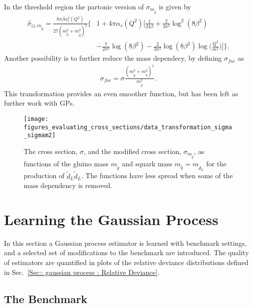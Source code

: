 \documentclass[twoside,english]{uiofysmaster}
\begin{document}
In the threshold region the partonic version of $\sigma_{m_{\tilde{g}}}$ is given by
\begin{align}
\hat{\sigma}_{ij, m_{\tilde{g}}} =  \frac{8 \pi \beta \alpha^2_s (Q^2)}{27(m_{\tilde{q}}^2 + m_{\tilde{g}}^2)^2} \Bigg\{&1 
 + 4 \pi \alpha_s (Q^2) \Bigg[ \frac{1}{24 \beta} 
 + \frac{2}{3 \pi^2} \log^2(8 \beta^2) \nonumber \\& - \frac{7}{2 \pi^2} \log (8 \beta^2)
- \frac{2}{3 \pi^2} \log (8 \beta^2) \log \Big( \frac{Q^2}{m^2} \Big) \Bigg] \Bigg\}.
\end{align}
Another possibility is to further reduce the mass dependecy, by defining $\sigma_{fac}$ as 
\begin{align}
\sigma_{fac} = \sigma \frac{(m_{\tilde{g}}^2 + m_{\tilde{q}}^2)^2}{m_{\tilde{g}}^2}.
\end{align}
This transformation provides an even smoother function, but has been left as further work with GPs.

\begin{figure}
\centering
\texttt{[image: figures\_evaluating\_cross\_sections/data\_transformation\_sigma\_sigmam2]}
\caption{The cross section, $\sigma$, and the modified cross section, $\sigma_{m_{\tilde{g}}}$,  as functions of the gluino mass $m_{\tilde{g}}$ and squark mass $m_{\tilde{q}} = m_{\tilde{d}_L}$ for the production of $\tilde{d}_L \tilde{d}_L$. The functions have less spread when some of the mass dependency is removed.}
\label{Fig:: evaluating cross : Comparison sigma and sigma/m}
\end{figure}

\section{Learning the Gaussian Process}

In this section a Gaussian process estimator is learned with benchmark settings, and a selected set of modifications to the benchmark are introduced. The quality of estimators are quantified in plots of the relative deviance distributions defined in Sec.~\ref{Sec:: gaussian process : Relative Deviance}.

\subsection{The Benchmark}\label{Sec:: evaluating cross : The Benchmark}
\end{document}
